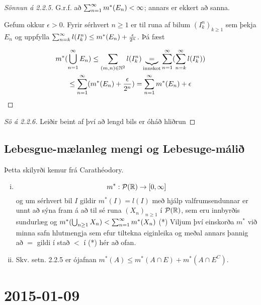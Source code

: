 \documentclass[12pt]{book}
\newcommand{\cP}{\mathcal{P}}
\begin{document}
\begin{proof}[Sönnun á 2.2.5]
  G.r.f. að $\sum_{n = 1}^{\infty} m^*(E_n) < \infty$; annars er ekkert að sanna.

      Gefum okkur $\epsilon > 0$. Fyrir sérhvert $n \geq 1$ er til runa af bilum
      $(I^n_k)_{k \geq 1}$ sem þekja $E_n$ og uppfylla
      $\sum_{n = {k}}^{\infty} l(I^n_k) \leq m^*(E_n) + \frac{\epsilon}{2^n}$. Þá fæst

      \begin{gather*}
        m^*(\bigcup_{n=1}^{\infty} E_n) \leq \sum_{(m,n) \in \mathbb{N}^2} l(I_k^n)
          \underbrace{=}_{\text{innskot}} \sum_{n = 1}^{\infty} (\sum_{n = {k}}^{\infty} l(I^n_k))\\
          \leq \sum_{n = 1}^{\infty} (m^*(E_n) + \frac{\epsilon}{2^n}) = \sum_{n = 1}^{\infty} m^*(E_n) + \epsilon
      \end{gather*}
        
\end{proof}
\begin{proof}[Sö á 2.2.6]
     Leiðir beint af því að lengd bils er óháð hliðrun 
\end{proof}

\section{Lebesgue-mælanleg mengi og Lebesuge-málið}

Þetta skilyrði kemur frá Carathéodory.

\begin{ath} 
  \begin{enumerate}[(i)] 
  \item \[m^*:  \cP(\R) \to [0, \infty] \]
    og um sérhvert bil $I$ gildir $m^{*}(I) = l(I)$
    með hjálp valfrumsendunnar er unnt að sýna fram á að til sé runa
    $(X_n)_{n\geq1}$ í $\cP(\R)$, sem eru innbyrðis sundurlæg og $m^*(\bigcup_{n\geq1}X_n) < \sum_{n = 1}^{\infty} m^*(X_n)$ (*)
    Viljum því einskorða $ m^* $ við minna safn hlutmengja sem efur tiltekna eiginleika og meðal annars þannig að $=$ gildi
    í stað $<$ í (*) hér að ofan.

  \item Skv. setn. 2.2.5 er ójafnan $m^*(A) \leq m^*(A\cap E) + m^*(A \cap E^C)$.
     
  \end{enumerate}
\end{ath}

\chapter{2015-01-09}
\end{document}
